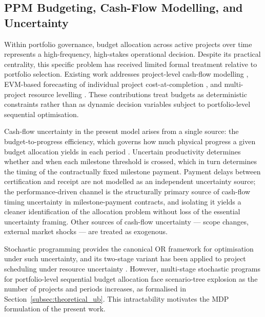 \subsection{PPM Budgeting, Cash-Flow Modelling, and Uncertainty}
\label{subsec:lr_cashflow}

Within portfolio governance, budget allocation across active projects
over time represents a high-frequency, high-stakes operational
decision. Despite its practical centrality, this specific problem has
received limited formal treatment relative to portfolio selection.
Existing work addresses project-level cash-flow modelling
\citep{Kenley2009, Park2004}, EVM-based forecasting of individual
project cost-at-completion \citep{Kim2002, Acebes2015}, and
multi-project resource levelling \citep{Lova2000, Peteghem2010}.
These contributions treat budgets as deterministic constraints rather
than as dynamic decision variables subject to portfolio-level
sequential optimisation.

Cash-flow uncertainty in the present model arises from a single
source: the budget-to-progress efficiency, which governs how much
physical progress a given budget allocation yields in each period
\citep{Acebes2015, Batselier2017}. Uncertain productivity determines
whether and when each milestone threshold is crossed, which in turn
determines the timing of the contractually fixed milestone payment.
Payment delays between certification and receipt are not modelled as
an independent uncertainty source; the performance-driven channel is
the structurally primary source of cash-flow timing uncertainty in
milestone-payment contracts, and isolating it yields a cleaner
identification of the allocation problem without loss of the essential
uncertainty framing. Other sources of cash-flow uncertainty --- scope
changes, external market shocks \citep{Doloi2012} --- are treated as
exogenous.

Stochastic programming \citep{Birge2011} provides the canonical OR
framework for optimisation under such uncertainty, and its two-stage
variant has been applied to project scheduling under resource
uncertainty \citep{Lova2000}. However, multi-stage stochastic programs
for portfolio-level sequential budget allocation face scenario-tree
explosion as the number of projects and periods increases, as
formalised in Section~\ref{subsec:theoretical_ub}. This
intractability motivates the MDP formulation of the present work.

